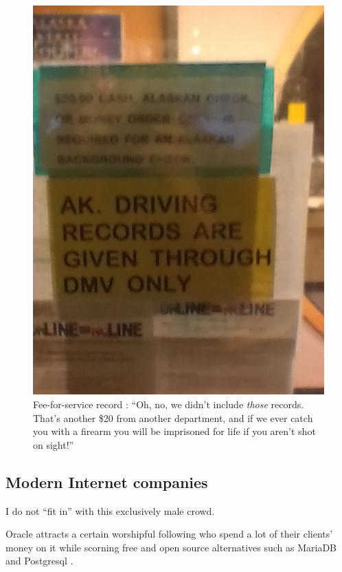 \documentclass[letterpaper]{article}
\begin{document}
\begin{figure}
\begin{minipage}{0.45\textwidth}
	\includegraphics[width=1.0\textwidth]{images/IMG_20171206_151246.jpg}
	\end{minipage}
	\caption[Fee-for-service records]{Fee-for-service record \cite{asp2017}: ``Oh, no, we didn't include \textit{those} records.  That's another \$20 from another department, and if we ever catch you with a firearm you will be imprisoned for life if you aren't shot on sight!''}
\end{figure}
\subsection{Modern Internet companies}
I do not ``fit in'' with this exclusively male crowd. 

Oracle \cite{orcl2016} attracts a certain worshipful following who spend a lot of their clients' money on it while scorning free and open source alternatives such as MariaDB \cite{mariadb2016} and Postgresql \cite{postgresql2016}.
\end{document}
